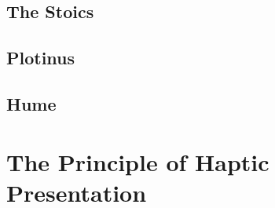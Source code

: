 \subsection{The Stoics} %
\label{sec:the_stoics}


\subsection{Plotinus} %
\label{sec:plotinus}


\subsection{Hume} %
\label{sec:hume}



\section{The Principle of Haptic Presentation} %
\label{sec:sympathy_as_the_principle_of_haptic_presentation}




